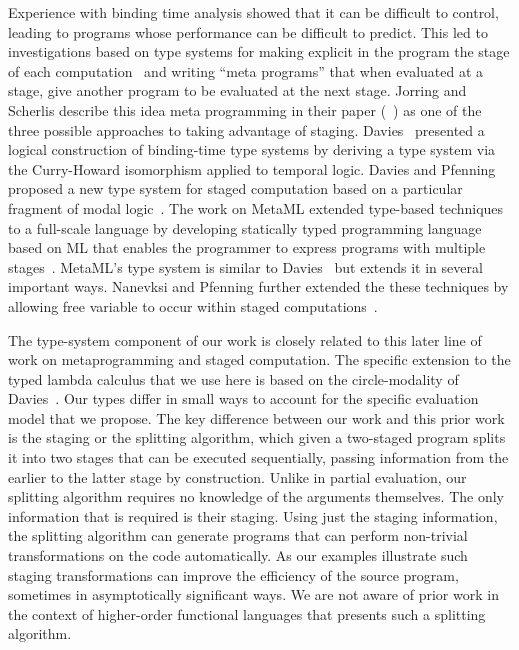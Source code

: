 Experience with binding time analysis showed that it can be difficult
to control, leading to programs whose performance can be difficult to
predict. This led to investigations based on type systems for making
explicit in the program the stage of each
computation~\cite{GJ91-lambda,NN92-twolevel} and writing ``meta
programs'' that when evaluated at a stage, give another program to be
evaluated at the next stage. Jorring and Scherlis describe this idea
meta programming in their paper (~\cite{JS86-staging}) as one of the
three possible approaches to taking advantage of
staging. Davies~\cite{davies96} presented a logical construction of
binding-time type systems by deriving a type system via the
Curry-Howard isomorphism applied to temporal logic.  Davies and
Pfenning proposed a new type system for staged computation based on a
particular fragment of modal logic~\cite{DP01-modal}. The work on
MetaML extended type-based techniques to a full-scale language by
developing statically typed programming language based on ML that
enables the programmer to express programs with multiple
stages~\cite{Taha97,taha-thesis-99}.  MetaML's type system is similar
to Davies~\cite{davies96} but extends it in several important ways.
Nanevksi and Pfenning further extended the these techniques by
allowing free variable to occur within staged
computations~\cite{NP05-nn}.

The type-system component of our work is closely related to this later
line of work on metaprogramming and staged computation.  The specific
extension to the typed lambda calculus that we use here is based on
the circle-modality of Davies~\cite{DP01-modal}.  Our types differ in
small ways to account for the specific evaluation model that we
propose.  The key difference between our work and this prior work is
the staging or the splitting algorithm, which given a two-staged
program splits it into two stages that can be executed sequentially,
passing information from the earlier to the latter stage by
construction. 
%
Unlike in partial evaluation, our splitting algorithm requires no
knowledge of the arguments themselves. The only information that is
required is their staging. Using just the staging information, the
splitting algorithm can generate programs that can perform non-trivial
transformations on the code automatically.  As our examples illustrate
such staging transformations can improve the efficiency of the source
program, sometimes in asymptotically significant ways.  
We are not aware of prior work in the context of higher-order
functional languages that presents such a splitting algorithm.


